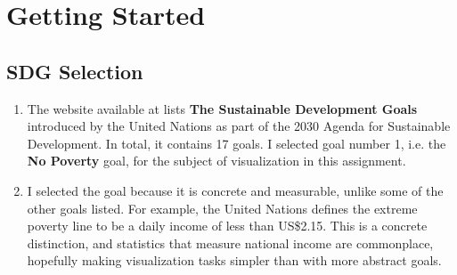 \documentclass[11pt,a4paper,titlepage]{article}
\begin{document}



\section{Getting Started}

\subsection{SDG Selection}
\begin{enumerate}
    \item The website available at \cite{sdgs} lists \textbf{The Sustainable Development Goals} introduced by the United Nations as part of the 2030 Agenda for Sustainable Development. In total, it contains 17 goals. I selected goal number 1, i.e. the \textbf{No Poverty} goal, for the subject of visualization in this assignment.
    \item I selected the goal because it is concrete and measurable, unlike some of the other goals listed. For example, the United Nations \cite{endpov} defines the extreme poverty line to be a daily income of less than US\$2.15. This is a concrete distinction, and statistics that measure national income are commonplace, hopefully making visualization tasks simpler than with more abstract goals.
\end{enumerate}
\end{document}
